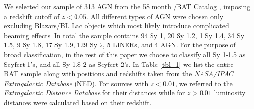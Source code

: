 We selected our sample of 313 AGN from the 58 month \swift/BAT Catalog \citep{Baumgartner:2012gf}, imposing a redshift cutoff of $z<0.05$. All different types of AGN were chosen only excluding Blazars/BL Lac objects which most likely introduce complicated beaming effects. In total the sample contains 94 Sy 1, 20 Sy 1.2, 1 Sy 1.4, 34 Sy 1.5, 9 Sy 1.8, 17 Sy 1.9, 129 Sy 2, 5 LINERs, and 4 AGN. For the purpose of broad classification, in the rest of this paper we choose to classify all Sy 1-1.5 as Seyfert 1's, and all Sy 1.8-2 as Seyfert 2's. In Table \ref{tbl_1} we list the entire \herschel{}-BAT sample along with positions and redshifts taken from the \href{http://ned.ipac.caltech.edu/}{\textit{NASA/IPAC Extragalactic Database} (NED)}. For sources with $z < 0.01$, we referred to the \href{http://edd.ifa.hawaii.edu/]}{\textit{Extragalactic Distance Database}} for their distances while for $z > 0.01$ luminosity distances were calculated based on their redshift.